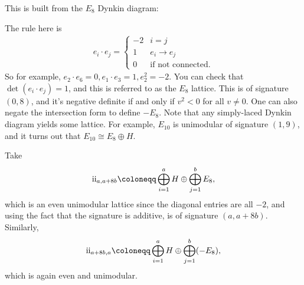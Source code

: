 \begin{example}

This is built from the \(E_8\) Dynkin diagram:

\begin{center}
\end{center}

The rule here is
\begin{align*}
e_i \cdot e_j = 
\begin{cases}
-2  & i =  j
\\
1 & e_i \to e_j \\
0 & \text{if not connected}.
\end{cases}
\end{align*}
So for example, \(e_2 \cdot e_6 = 0, e_1 \cdot e_3 = 1, e_2^2 = -2\).
You can check that \(\det(e_i \cdot e_j) = 1\), and this is referred to
as the \(E_8\) lattice. This is of signature \((0, 8)\), and it's
negative definite if and only if \(v^2 < 0\) for all \(v\neq 0\). One
can also negate the intersection form to define \(-E_8\). Note that any
simply-laced Dynkin diagram yields some lattice. For example, \(E_{10}\)
is unimodular of signature \((1, 9)\), and it turns out that
\(E_{10} \cong E_8 \oplus H\).

\end{example}

\begin{definition}[?]

Take
\begin{align*} 
%
  \textup{\uppercase{\romannumeral 2}}%
_{a, a+8b} \coloneqq\bigoplus_{i=1}^a H \oplus \bigoplus_{j=1}^b E_8 
,\end{align*}
which is an even unimodular lattice since the diagonal entries are all
\(-2\), and using the fact that the signature is additive, is of
signature \((a, a+8b)\). Similarly,
\begin{align*} 
%
  \textup{\uppercase{\romannumeral 2}}%
_{a+8b, a} \coloneqq\bigoplus_{i=1}^a H \oplus \bigoplus_{j=1}^b (-E_8) 
,\end{align*}
which is again even and unimodular.

\end{definition}

